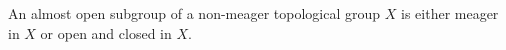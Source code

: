 An almost open subgroup of a non-meager topological group $X$ is either meager in $X$ or open and closed in $X$.
